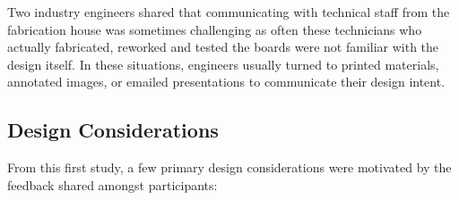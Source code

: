 \documentclass [11pt, proquest] {uwthesis}[2020/02/24]
\begin{document}
Two industry engineers shared that communicating with technical staff from the fabrication house was sometimes challenging as often these technicians who actually fabricated, reworked and tested the boards were not familiar with the design itself.
In these situations, engineers usually turned to printed materials, annotated images, or emailed presentations to communicate their design intent.


\subsection{Design Considerations}
\label{Design Considerations}

From this first study, a few primary design considerations were motivated by the feedback shared amongst participants:
\end{document}
